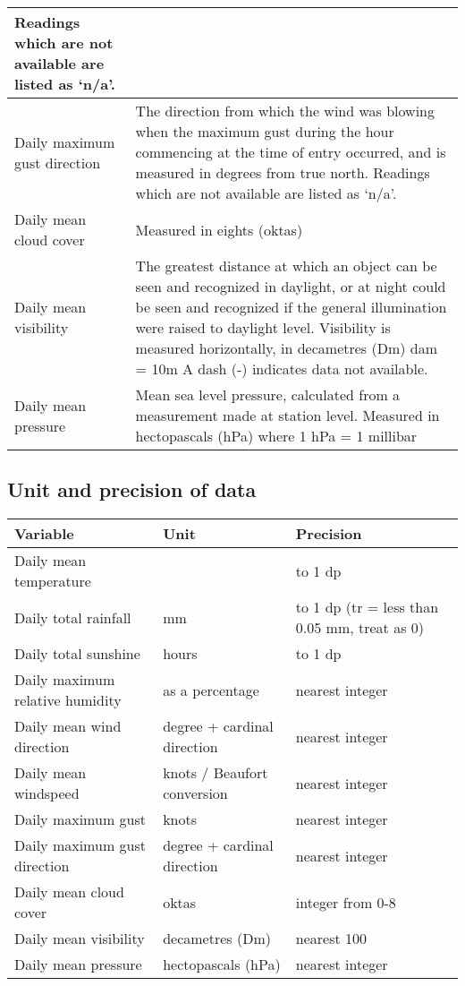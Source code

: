 \begin{tabular}{|p{5.5cm}|p{11.5cm}|}
	Readings which are not available are listed as ‘n/a’.  \\
	\hline
	Daily maximum gust direction & The direction from which the wind was blowing when the maximum gust during the hour commencing at the time of entry occurred, and is measured in degrees from true north.  \newline
	Readings which are not available are listed as ‘n/a’.  \\
	\hline
	Daily mean cloud cover & Measured in eights (oktas)   \\
	\hline
	Daily mean visibility & The greatest distance at which an object can be seen and recognized in daylight, or at night could be seen and recognized if the general illumination were raised to daylight level. 
	\newline Visibility is measured horizontally, in decametres (Dm) dam = 10m \newline A dash (-) indicates data not available.
	\\
	\hline
	Daily mean pressure & Mean sea level pressure, calculated from a measurement made at station level. \newline Measured in hectopascals (hPa) 	where 1 hPa = 1 millibar
	\\
	\hline
\end{tabular}
\subsection{Unit and precision of data}
\begin{tabular}{|l|l|l|}
	\hline
	\textbf{Variable} & \textbf{Unit} & \textbf{Precision}\\
	\hline
	Daily mean temperature & \textcelsius & to 1 dp\\
	\hline
	Daily total rainfall & mm & to 1 dp (tr = less than 0.05 mm, treat as 0)\\
	\hline
	Daily total sunshine & hours & to 1 dp \\
	\hline
	Daily maximum relative humidity & as a percentage & nearest integer \\
	\hline
	Daily mean wind direction & degree + cardinal direction & nearest integer  \\
	\hline
	Daily mean windspeed & knots / Beaufort conversion & nearest integer \\
	\hline
	Daily maximum gust & knots & nearest integer   \\
	\hline
	Daily maximum gust direction & degree + cardinal direction & nearest integer   \\
	\hline
	Daily mean cloud cover & oktas  & integer from 0-8   \\
	\hline
	Daily mean visibility & decametres (Dm) & nearest 100  \\
	\hline
	Daily mean pressure & hectopascals (hPa) & nearest integer  \\
	\hline
\end{tabular}


